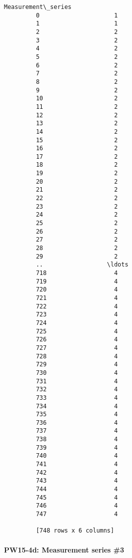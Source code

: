 \documentclass{article}
\begin{document}
\begin{Verbatim}[commandchars=\\\{\}]
              Measurement\_series  
         0                     1  
         1                     1  
         2                     2  
         3                     2  
         4                     2  
         5                     2  
         6                     2  
         7                     2  
         8                     2  
         9                     2  
         10                    2  
         11                    2  
         12                    2  
         13                    2  
         14                    2  
         15                    2  
         16                    2  
         17                    2  
         18                    2  
         19                    2  
         20                    2  
         21                    2  
         22                    2  
         23                    2  
         24                    2  
         25                    2  
         26                    2  
         27                    2  
         28                    2  
         29                    2  
         ..                  \ldots  
         718                   4  
         719                   4  
         720                   4  
         721                   4  
         722                   4  
         723                   4  
         724                   4  
         725                   4  
         726                   4  
         727                   4  
         728                   4  
         729                   4  
         730                   4  
         731                   4  
         732                   4  
         733                   4  
         734                   4  
         735                   4  
         736                   4  
         737                   4  
         738                   4  
         739                   4  
         740                   4  
         741                   4  
         742                   4  
         743                   4  
         744                   4  
         745                   4  
         746                   4  
         747                   4  
         
         [748 rows x 6 columns]
\end{Verbatim}
        

    \paragraph{PW15-4d: Measurement series \#3}
\end{document}
